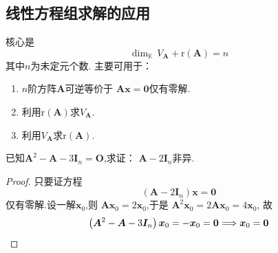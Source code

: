 \subsection{线性方程组求解的应用}
\begin{formal}
\begin{proposition}[线性方程组求解的相关应用]\label{prop:线性方程组求解的相关应用}
    核心是
\[
\dim_{\mathbb{K}}\,V_{\bm{A}} +
\mathrm{r}\left(\bm{A}\right)=n
\]
其中$n$为未定元个数.
主要可用于：
\begin{enumerate}[label=\textup{\arabic*}]
    \item $n$阶方阵$\bm{A}$可逆等价于
    $\bm{Ax}=\bm{0}$仅有零解.
    \item 利用$\mathrm{r}\left(\bm{A}
    \right)$求$V_{\bm{A}}$.
    \item 利用$V_{\bm{A}}$求$\mathrm{r}\left(
        \bm{A}\right)$.
\end{enumerate}
\end{proposition}
\end{formal}
\begin{brown}
\begin{example}
    已知$\bm{A}^2-\bm{A}-3\bm{I}_n=\bm{O}$,求证：
    $\bm{A}-2\bm{I}_n$非异.
\end{example}
\begin{proof}
    只要证方程
    \[
    \left(\bm{A}-2\bm{I}_n\right)\bm{x}=\bm{0}
    \]
    仅有零解.设一解$\bm{x}_0$,则
    $\bm{Ax}_0=2\bm{x}_0$,于是
    $\bm{A}^2\bm{x}_0=2\bm{Ax}_0=4\bm{x}_0$,
    故
    \[
    \left(\bm{A}^2-\bm{A}-3\bm{I}_n\right)\bm{x}_0=-\bm{x}_0=\bm{0}\Longrightarrow \bm{x}_0
    =\bm{0}
    \qedhere
    \]
\end{proof}
\end{brown}
